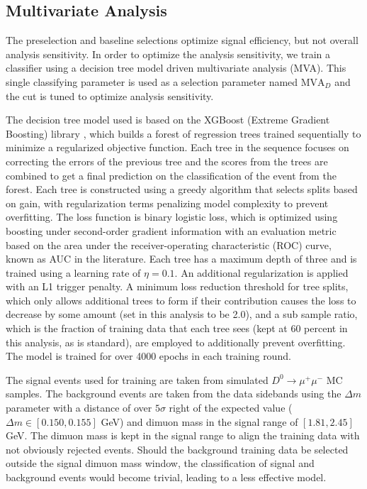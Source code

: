 

\subsection{Multivariate Analysis}
\label{subsec:mva}

The preselection and baseline selections optimize signal efficiency, but not overall analysis sensitivity. In order to optimize the analysis sensitivity, we train a classifier using a decision tree model driven multivariate analysis (MVA). This single classifying parameter is used as a selection parameter named $\text{MVA}_D$ and the cut is tuned to optimize analysis sensitivity.

The decision tree model used is based on the XGBoost (Extreme Gradient Boosting) library \cite{ref:chen_Guestrin_2016}, which builds a forest of regression trees trained sequentially to minimize a regularized objective function. Each tree in the sequence focuses on correcting the errors of the previous tree and the scores from the trees are combined to get a final prediction on the classification of the event from the forest. Each tree is constructed using a greedy algorithm that selects splits based on gain, with regularization terms penalizing model complexity to prevent overfitting. The loss function is binary logistic loss, which is optimized using boosting under second-order gradient information with an evaluation metric based on the area under the receiver-operating characteristic (ROC) curve, known as AUC in the literature. Each tree has a maximum depth of three and is trained using a learning rate of $\eta = 0.1$. An additional regularization is applied with an L1 trigger penalty. A minimum loss reduction threshold for tree splits, which only allows additional trees to form if their contribution causes the loss to decrease by some amount (set in this analysis to be 2.0), and a sub sample ratio, which is the fraction of training data that each tree sees (kept at 60 percent in this analysis, as is standard), are employed to additionally prevent overfitting. The model is trained for over 4000 epochs in each training round.

The signal events used for training are taken from simulated $D^0 \to \mu^+ \mu^-$ MC samples. The background events are taken from the data sidebands using the $\Delta m$ parameter with a distance of over $5\sigma$ right of the expected value ($\Delta m \in [0.150, 0.155]$ GeV) and dimuon mass in the signal range of $[1.81, 2.45]$ GeV. The dimuon mass is kept in the signal range to align the training data with not obviously rejected events. Should the background training data be selected outside the signal dimuon mass window, the classification of signal and background events would become trivial, leading to a less effective model.


